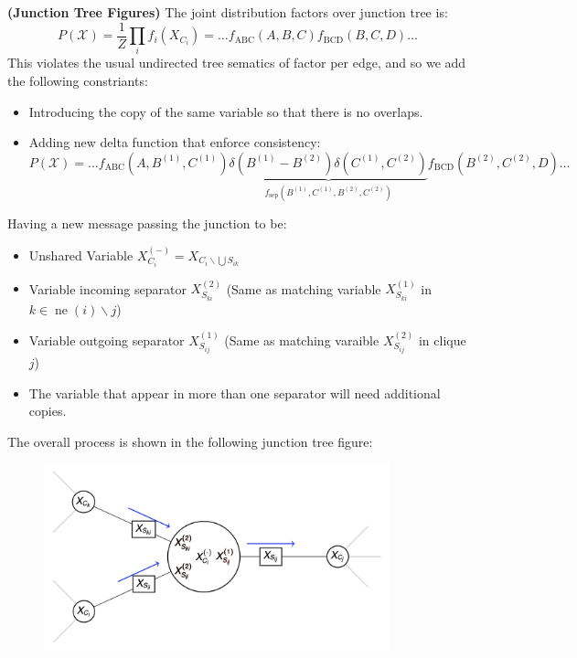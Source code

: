 \begin{remark}{\textbf{(Junction Tree Figures)}}
    The joint distribution factors over junction tree is:
    \begin{equation*}
        P(\mathcal{X})  = \frac{1}{Z}\prod_if_i(X_{C_i}) = \dots f_\text{ABC}(A, B, C)f_\text{BCD}(B, C, D)\dots
    \end{equation*}
    This violates the usual undirected tree sematics of factor per edge, and so we add the following constriants:
    \begin{itemize}
        \item Introducing the copy of the same variable so that there is no overlaps. 
        \item Adding new delta function that enforce consistency:
        \begin{equation*}
            P(\mathcal{X}) = \dots f_\text{ABC}(A, B^{(1)}, C^{(1)})\underbrace{\delta(B^{(1)} - B^{(2)})\delta(C^{(1)}, C^{(2)})}_{f_\text{sep}(B^{(1)}, C^{(1)}, B^{(2)}, C^{(2)})}f_\text{BCD}(B^{(2)}, C^{(2)}, D)\dots
        \end{equation*}
    \end{itemize}
    Having a new message passing the junction to be:
    \begin{itemize}
        \item Unshared Variable $X^{(-)}_{C_i} = X_{C_i \backslash \bigcup S_{ik}}$
        \item Variable incoming separator $X^{(2)}_{S_{ki}}$ (Same as matching variable $X^{(1)}_{S_{ki}}$ in $k\in\operatorname{ne}(i)\backslash j$)
        \item Variable outgoing separator $X^{(1)}_{S_{ij}}$ (Same as matching varaible $X^{(2)}_{S_{ij}}$ in clique $j$)
        \item The variable that appear in more than one separator will need additional copies.
    \end{itemize}
    The overall process is shown in the following junction tree figure:
    \begin{figure}[H]
        \centering
        \includegraphics[width=10cm]{img/img10.png}
    \end{figure}  
\end{remark}

